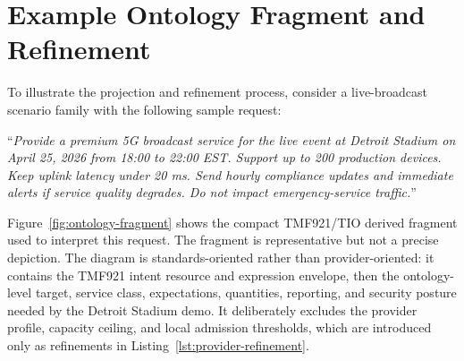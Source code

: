 \documentclass[conference]{IEEEtran}
\begin{document}
\section{Example Ontology Fragment and Refinement}
To illustrate the projection and refinement process, consider a live-broadcast scenario family with the following sample request: 

\par\indent ``\textit{Provide a premium 5G broadcast service for the live event at Detroit Stadium on April 25, 2026 from 18:00 to 22:00 EST. Support up to 200 production devices. Keep uplink latency under 20 ms. Send hourly compliance updates and immediate alerts if service quality degrades. Do not impact emergency-service traffic.}''

Figure~\ref{fig:ontology-fragment} shows the compact TMF921/TIO derived fragment used to interpret this request. The fragment is representative but not a precise depiction. The diagram is standards-oriented rather than provider-oriented: it contains the TMF921 intent resource and expression envelope, then the ontology-level target, service class, expectations, quantities, reporting, and security posture needed by the Detroit Stadium demo. It deliberately excludes the provider profile, capacity ceiling, and local admission thresholds, which are introduced only as refinements in Listing~\ref{lst:provider-refinement}.
\end{document}
